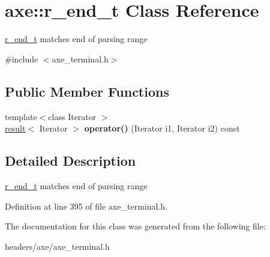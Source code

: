 \hypertarget{classaxe_1_1r__end__t}{\section{axe\+:\+:r\+\_\+end\+\_\+t Class Reference}
\label{classaxe_1_1r__end__t}
}


\hyperlink{classaxe_1_1r__end__t}{r\+\_\+end\+\_\+t} matches end of parsing range  




{\ttfamily \#include $<$axe\+\_\+terminal.\+h$>$}

\subsection*{Public Member Functions}
\begin{DoxyCompactItemize}
\item 
\hypertarget{classaxe_1_1r__end__t_a89f6984c18f484e6dee7e7e737882e5f}{{\footnotesize template$<$class Iterator $>$ }\\\hyperlink{structaxe_1_1result}{result}$<$ Iterator $>$ {\bfseries operator()} (Iterator i1, Iterator i2) const }\label{classaxe_1_1r__end__t_a89f6984c18f484e6dee7e7e737882e5f}

\end{DoxyCompactItemize}


\subsection{Detailed Description}
\hyperlink{classaxe_1_1r__end__t}{r\+\_\+end\+\_\+t} matches end of parsing range 

Definition at line 395 of file axe\+\_\+terminal.\+h.



The documentation for this class was generated from the following file\+:\begin{DoxyCompactItemize}
\item 
headers/axe/axe\+\_\+terminal.\+h\end{DoxyCompactItemize}
